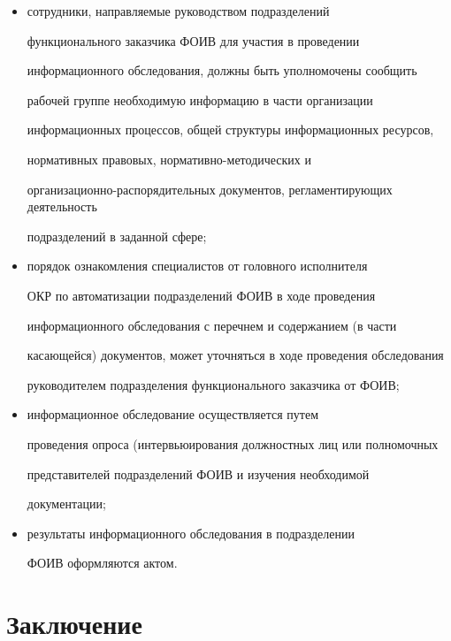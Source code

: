 \begin{itemize}
согласовывается с подразделением функционального заказчика ФОИВ и 


заказчиком;


      \item сотрудники, направляемые руководством подразделений 


функционального заказчика ФОИВ для участия в проведении 


информационного обследования, должны быть уполномочены сообщить 


рабочей группе необходимую информацию в части организации 


информационных процессов, общей структуры информационных ресурсов, 


нормативных правовых, нормативно-ме\-то\-ди\-че\-ских и 


организационно-распорядительных документов, регламентирующих деятельность 


подразделений в заданной сфере; 


      \item порядок ознакомления специалистов от  головного исполнителя 


ОКР по автоматизации подразделений ФОИВ в ходе проведения 


информационного обследования с перечнем и содержанием (в части 


касающейся) документов, может уточняться в ходе проведения обследования 


руководителем подразделения функционального заказчика от ФОИВ;


      \item информационное обследование осуществляется путем 


проведения опроса (интервьюирования должностных лиц или полномочных 


представителей подразделений ФОИВ и изучения необходимой 


документации;


      \item результаты информационного обследования в подразделении  


ФОИВ оформляются актом. 


      \end{itemize}


      


       \section{Заключение}


